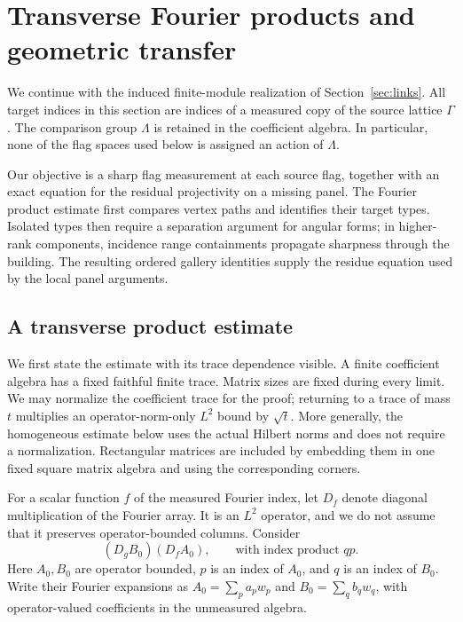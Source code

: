 \section{Transverse Fourier products and geometric transfer}
\label{sec:transfer}

We continue with the induced finite-module realization of
Section~\ref{sec:links}. All target indices in this section are indices
of a measured copy of the source lattice $\Gamma$. The comparison group
$\Lambda$ is retained in the coefficient algebra. In particular, none of
the flag spaces used below is assigned an action of $\Lambda$.

Our objective is a sharp flag measurement at each source flag, together
with an exact equation for the residual projectivity on a missing panel.
The Fourier product estimate first compares vertex paths and identifies
their target types. Isolated types then require a separation argument for
angular forms; in higher-rank components, incidence range containments
propagate sharpness through the building. The resulting ordered gallery
identities supply the residue equation used by the local panel arguments.

\subsection{A transverse product estimate}

We first state the estimate with its trace dependence visible. A finite
coefficient algebra has a fixed faithful finite trace. Matrix sizes are
fixed during every limit. We may normalize the coefficient trace for the
proof; returning to a trace of mass $t$ multiplies an operator-norm-only
$L^2$ bound by $\sqrt t$. More generally, the homogeneous estimate below
uses the actual Hilbert norms and does not require a normalization.
Rectangular matrices are included by embedding them in one fixed square
matrix algebra and using the corresponding corners.

For a scalar function $f$ of the measured Fourier index, let $D_f$
denote diagonal multiplication of the Fourier array. It is an $L^2$
operator, and we do not assume that it preserves operator-bounded
columns. Consider
\begin{equation}
 (D_g B_0)(D_f A_0),\qquad\text{with index product }qp.
 \label{eq:input-2}
\end{equation}
Here $A_0,B_0$ are operator bounded, $p$ is an index of $A_0$, and $q$
is an index of $B_0$. Write their Fourier expansions as
$A_0=\sum_p a_pw_p$ and $B_0=\sum_q b_qw_q$, with
operator-valued coefficients in the unmeasured algebra.

